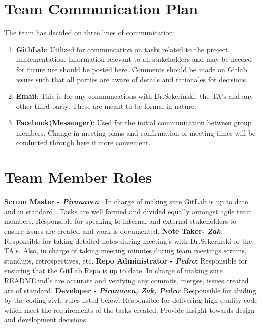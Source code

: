 \documentclass{article}
\begin{document}
\section{Team Communication Plan}

The team has decided on three lines of communication:

\begin{enumerate}
\item \textbf{GithLab}: Utilized for communcation on tasks related to the project implementation. Information relevant to all stakeholders and may be needed for future use should be posted here.  Comments should be made on Gitlab issues such that all parties are aware of details and rationales for decisions.
\item \textbf{Email}: This is for any communcations with Dr.Sekerinski, the TA's and any other third party. These are meant to be formal in nature.
\item \textbf{Facebook(Messenger)}: Used for the initial communication between group members. Change in meeting plans and confirmation of meeting times will be conducted through here if more convenient.
\end{enumerate}

\section{Team Member Roles}

\textbf{Scrum Master -\emph{ Piranaven }}: In charge of making sure GitLab is up to date and in standard . Tasks are well formed and divided equally amongst agile team members. Responsible for  speaking to internal and external stakeholders to ensure issues are created and work is documented. \newline
\textbf{Note Taker- \emph{Zak}}:  Responsible for taking detailed notes during meeting's with Dr.Sekerinski or the TA's. Also, in charge of taking meeting minutes during team meetings  scrums, standups, retrospectives, etc. \newline
\textbf{Repo Administrator - \emph{ Pedro}}:  Responsible for ensuring that the GitLab Repo is up to date. In charge of making sure README.md's are accurate and verifying any commits, merges, issues created are of standard.   \newline
\textbf{Developer - \emph{ Piranaven, Zak, Pedro}}: Responsible for abiding by the coding style rules listed below. Responsible for delivering high quality code which meet the requirements of the tasks created. Provide insight towards design and development decisions.  \newline
\end{document}
